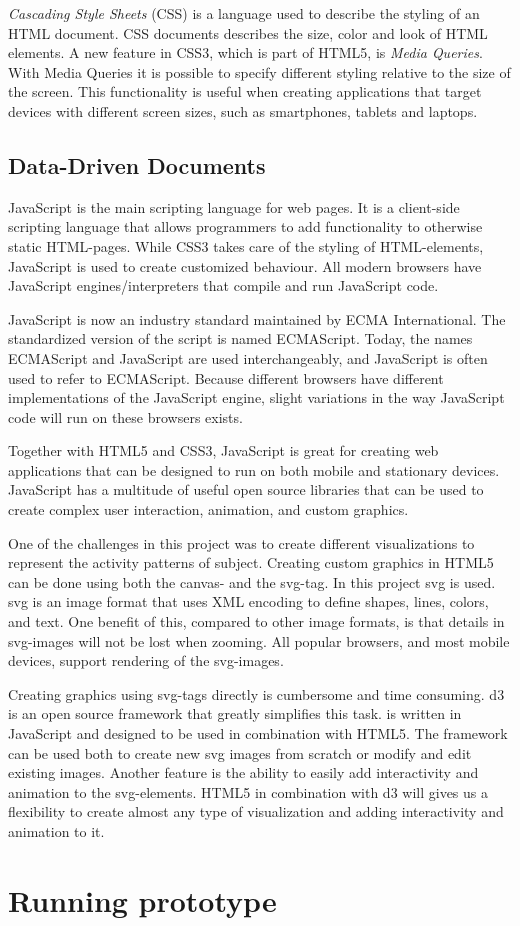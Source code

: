\emph{Cascading Style Sheets} (CSS) is a language used to describe the styling of an HTML document. CSS documents describes the size, color and look of HTML elements. A new feature in CSS3, which is part of HTML5, is \emph{Media Queries}. With Media Queries it is possible to specify different styling relative to the size of the screen. This functionality is useful when creating applications that target devices with different screen sizes, such as smartphones, tablets and laptops. 

\subsection{Data-Driven Documents}
JavaScript is the main scripting language for web pages. It is a client-side scripting language that allows programmers to add functionality to otherwise static HTML-pages. While CSS3 takes care of the styling of HTML-elements, JavaScript is used to create customized behaviour. All modern browsers have JavaScript engines/interpreters that compile and run JavaScript code.

JavaScript is now an industry standard maintained by ECMA International. The standardized version of the script is named ECMAScript. Today, the names ECMAScript and JavaScript are used interchangeably, and JavaScript is often used to refer to ECMAScript. Because different browsers have different implementations of the JavaScript engine, slight variations in the way JavaScript code will run on these browsers exists.

Together with HTML5 and CSS3, JavaScript is great for creating web applications that can be designed to run on both mobile and stationary devices. JavaScript has a multitude of useful open source libraries that can be used to create complex user interaction, animation, and custom graphics.

One of the challenges in this project was to create different visualizations to represent the activity patterns of subject. Creating custom graphics in HTML5 can be done using both the canvas- and the svg-tag. In this project \gls{svg} is used. \gls{svg} is an image format that uses XML encoding to define shapes, lines, colors, and text. One benefit of this, compared to other image formats, is that details in \gls{svg}-images will not be lost when zooming. All popular browsers, and most mobile devices, support rendering of the \gls{svg}-images.

Creating graphics using svg-tags directly is cumbersome and time consuming. \gls{d3} is an open source framework that greatly simplifies this task.  is written in JavaScript and designed to be used in combination with HTML5. The framework can be used both to create new \gls{svg} images from scratch or modify and edit existing images. Another feature is the ability to easily add interactivity and animation to the \gls{svg}-elements. HTML5 in combination with \gls{d3} will gives us a flexibility to create almost any type of visualization and adding interactivity and animation to it.

\section{Running prototype}
